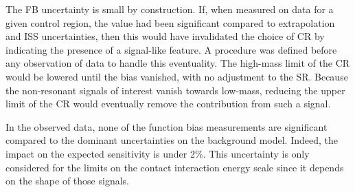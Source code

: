 The FB uncertainty is small by construction.
If, when measured on data for a given control region, the value had been significant compared to extrapolation and ISS uncertainties, then this would have invalidated the choice of CR by indicating the presence of a signal-like feature.
A procedure was defined before any observation of data to handle this eventuality.
The high-mass limit of the CR would be lowered until the bias vanished, with no adjustment to the SR. 
Because the non-resonant signals of interest vanish towards low-mass, reducing the upper limit of the CR would eventually remove the contribution from such a signal.

In the observed data, none of the function bias measurements are significant compared to the dominant uncertainties on the background model.
Indeed, the impact on the expected sensitivity is under 2\%.
This uncertainty is only considered for the limits on the contact interaction energy scale \lam since it depends on the shape of those signals.


